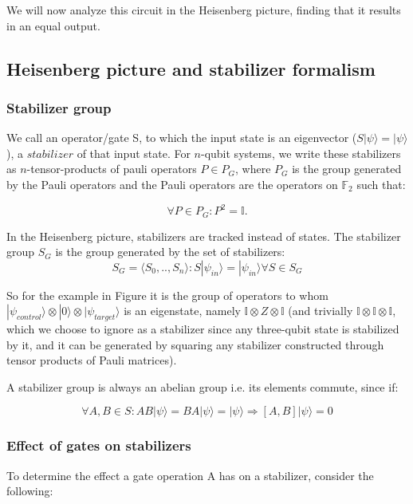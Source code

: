 We will now analyze this circuit in the Heisenberg picture,
finding that it results in an equal output.

\subsection{Heisenberg picture and stabilizer formalism}
\subsubsection{Stabilizer group}
We call an operator/gate S, to which the input state is an
eigenvector ($S|\psi\rangle=|\psi\rangle$), a $stabilizer$ of that input state. 
For $n$-qubit systems, we write these stabilizers as $n$-tensor-products 
of pauli operators $P \in P_{G}$,
where $P_{G}$ is the group generated by the Pauli operators and
the Pauli operators are the operators on $\mathbb{F}_{2}$ such that:

\begin{equation}
    \forall P\in P_{G}: P^{2}=\mathbb{I}.
\end{equation}

In the Heisenberg picture, stabilizers are tracked instead of
states. 
The stabilizer group $S_{G}$ is the group generated by
the set of stabilizers:
\begin{equation}
	S_{G} = \langle S_{0},..,S_{n}\rangle: S|\psi_{in}\rangle = 
	|\psi_{in}\rangle \forall S \in S_{G}
\end{equation}

So for the example in Figure%
 it is the group
of operators to whom
$|\psi_{control}\rangle \otimes |0\rangle \otimes 
|\psi_{target}\rangle$ is an eigenstate, namely 
$\mathbb{I}\otimes Z \otimes \mathbb{I}$ (and trivially
$\mathbb{I}\otimes\mathbb{I}\otimes\mathbb{I}$, which we choose
to ignore as a stabilizer since any three-qubit state
is stabilized by it, and it can be generated by squaring any
stabilizer constructed through tensor products of Pauli matrices).

A stabilizer group is always an abelian group i.e. its elements 
 commute, since if:

\begin{equation}
	\label{abelian_stabilizers_equation}
	\forall A,B \in S: AB|\psi\rangle = BA|\psi\rangle = |\psi\rangle
	\Rightarrow [A,B]|\psi\rangle=0
\end{equation}

\subsubsection{Effect of gates on stabilizers}
To determine the effect a gate operation A has on a
stabilizer, consider the following:

